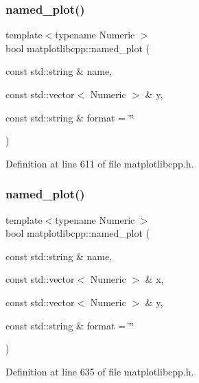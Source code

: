 \subsubsection{\texorpdfstring{named\_plot()}{named\_plot()}\hspace{0.1cm}{\footnotesize\ttfamily [1/2]}}
{\footnotesize\ttfamily template$<$typename Numeric $>$ \\
bool matplotlibcpp\+::named\+\_\+plot (\begin{DoxyParamCaption}\item[{const std\+::string \&}]{name,  }\item[{const std\+::vector$<$ Numeric $>$ \&}]{y,  }\item[{const std\+::string \&}]{format = {\ttfamily \char`\"{}\char`\"{}} }\end{DoxyParamCaption})}



Definition at line 611 of file matplotlibcpp.\+h.

\mbox{\label{namespacematplotlibcpp_a547854898d3b05c1ed182ad744545f43}} 
\subsubsection{\texorpdfstring{named\_plot()}{named\_plot()}\hspace{0.1cm}{\footnotesize\ttfamily [2/2]}}
{\footnotesize\ttfamily template$<$typename Numeric $>$ \\
bool matplotlibcpp\+::named\+\_\+plot (\begin{DoxyParamCaption}\item[{const std\+::string \&}]{name,  }\item[{const std\+::vector$<$ Numeric $>$ \&}]{x,  }\item[{const std\+::vector$<$ Numeric $>$ \&}]{y,  }\item[{const std\+::string \&}]{format = {\ttfamily \char`\"{}\char`\"{}} }\end{DoxyParamCaption})}



Definition at line 635 of file matplotlibcpp.\+h.

\mbox{\label{namespacematplotlibcpp_a7696c0134091453723de840be016e43a}} 
